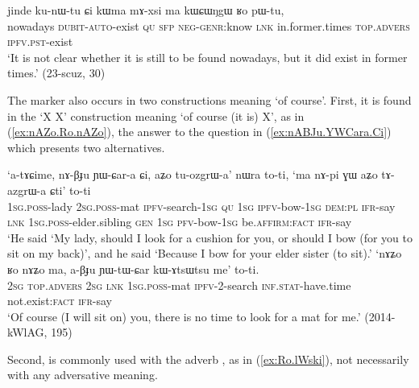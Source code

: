 \begin{exe}
\ex \label{ex:Ro.pWtu}
\gll jinde ku-nɯ-tu ɕi kɯma mɤ-xsi ma kɯɕɯŋgɯ ʁo pɯ-tu, \\
nowadays \textsc{dubit}-\textsc{auto}-exist \textsc{qu} \textsc{sfp} \textsc{neg}-\textsc{genr}:know \textsc{lnk} in.former.times \textsc{top}.\textsc{advers} \textsc{ipfv}.\textsc{pst}-exist \\
\glt `It is not clear whether it is still to be found nowadays, but it did exist in former times.' (23-scuz, 30)
\end{exe}

The marker  also occurs in two constructions meaning `of course'. First, it is found in the `X  X' construction meaning `of course (it is)  X', as in (\ref{ex:nAZo.Ro.nAZo}), the answer to the question in (\ref{ex:nABJu.YWCara.Ci}) which presents two alternatives.

\begin{exe}
\ex
\begin{xlist}
\ex  \label{ex:nABJu.YWCara.Ci}
\gll `a-tɤɕime, nɤ-βɟu ɲɯ-ɕar-a ɕi, aʑo tu-ozgrɯ-a' nɯra to-ti, `ma nɤ-pi ɣɯ aʑo tɤ-azgrɯ-a ɕti' to-ti  \\
\textsc{1sg}.\textsc{poss}-lady \textsc{2sg}.\textsc{poss}-mat \textsc{ipfv}-search-\textsc{1sg} \textsc{qu} \textsc{1sg} \textsc{ipfv}-bow-\textsc{1sg} \textsc{dem}:\textsc{pl} \textsc{ifr}-say \textsc{lnk} \textsc{1sg}.\textsc{poss}-elder.sibling \textsc{gen} \textsc{1sg} \textsc{pfv}-bow-\textsc{1sg} be.\textsc{affirm}:\textsc{fact} \textsc{ifr}-say \\
\glt `He said `My lady, should I look for a cushion for you, or should I bow (for you to sit on my back)', and he said  `Because I bow for your elder sister (to sit).'
\ex  \label{ex:nAZo.Ro.nAZo}
\gll  `nɤʑo ʁo nɤʑo ma, a-βɟu ɲɯ-tɯ-ɕar kɯ-ɤtsɯtsu me' to-ti.   \\
\textsc{2sg} \textsc{top}.\textsc{advers} \textsc{2sg} \textsc{lnk} \textsc{1sg}.\textsc{poss}-mat \textsc{ipfv}-2-search \textsc{inf}.\textsc{stat}-have.time  not.exist:\textsc{fact} \textsc{ifr}-say \\
\glt  `Of course (I will sit on) you, there is no time to look for a mat for me.' (2014-kWlAG, 195)
\end{xlist}
\end{exe}

Second,  is commonly used with the adverb , as in (\ref{ex:Ro.lWski}), not necessarily with any adversative meaning.

